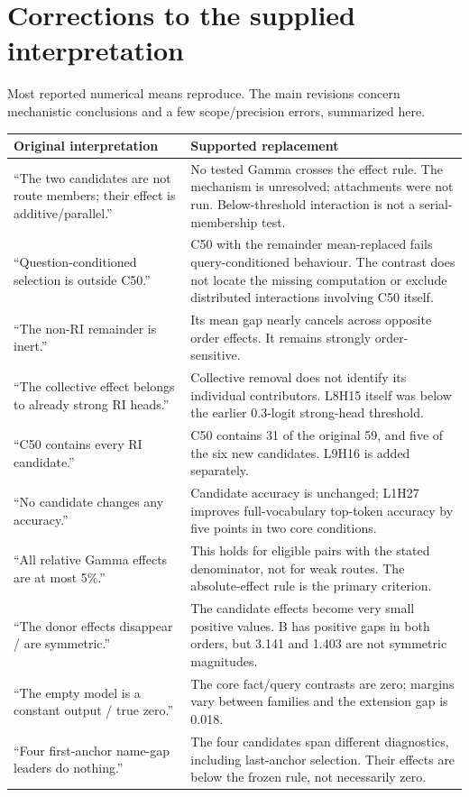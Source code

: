 \documentclass[11pt,a4paper]{article}
\begin{document}
\section{Corrections to the supplied interpretation}
Most reported numerical means reproduce. The main revisions concern mechanistic
conclusions and a few scope/precision errors, summarized here.
\small
\begin{longtable}{@{}p{5.6cm}p{10.4cm}@{}}
\toprule
Original interpretation & Supported replacement \\
\midrule
\endhead
``The two candidates are not route members; their effect is additive/parallel.'' &
No tested Gamma crosses the effect rule. The mechanism is unresolved; attachments
were not run. Below-threshold interaction is not a serial-membership test.\\
\addlinespace
``Question-conditioned selection is outside C50.'' &
C50 with the remainder mean-replaced fails query-conditioned behaviour. The
contrast does not locate the missing computation or exclude distributed
interactions involving C50 itself.\\
\addlinespace
``The non-RI remainder is inert.'' &
Its mean gap nearly cancels across opposite order effects. It remains strongly
order-sensitive.\\
\addlinespace
``The collective effect belongs to already strong RI heads.'' &
Collective removal does not identify its individual contributors. L8H15 itself
was below the earlier 0.3-logit strong-head threshold.\\
\addlinespace
``C50 contains every RI candidate.'' &
C50 contains 31 of the original 59, and five of the six new candidates. L9H16 is
added separately.\\
\addlinespace
``No candidate changes any accuracy.'' &
Candidate accuracy is unchanged; L1H27 improves full-vocabulary top-token
accuracy by five points in two core conditions.\\
\addlinespace
``All relative Gamma effects are at most 5\%.'' &
This holds for eligible pairs with the stated denominator, not for weak routes.
The absolute-effect rule is the primary criterion.\\
\addlinespace
``The donor effects disappear / are symmetric.'' &
The candidate effects become very small positive values. B has positive gaps in
both orders, but 3.141 and 1.403 are not symmetric magnitudes.\\
\addlinespace
``The empty model is a constant output / true zero.'' &
The core fact/query contrasts are zero; margins vary between families and the
extension gap is 0.018.\\
\addlinespace
``Four first-anchor name-gap leaders do nothing.'' &
The four candidates span different diagnostics, including last-anchor selection.
Their effects are below the frozen rule, not necessarily zero.\\
\bottomrule
\end{longtable}
\normalsize
\end{document}
